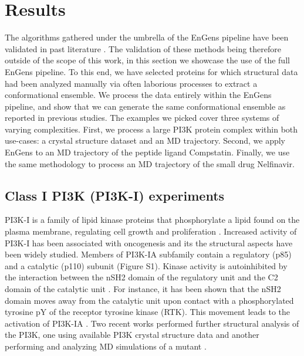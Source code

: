 \documentclass[numsec,webpdf,contemporary,large]{oup-authoring-template}
\theoremstyle{thmstyleone}%
\theoremstyle{thmstyletwo}%
\theoremstyle{thmstylethree}%
\begin{document}
\section{Results}

The algorithms gathered under the umbrella of the EnGens pipeline have been validated in past literature \citep{scherer_pyemma_2015, chen_nonlinear_2019, trozzi_umap_2021, perez-hernandez_identification_2013, schwantes_modeling_2015}. The validation of these methods being therefore outside of the scope of this work, in this section we showcase the use of the full EnGens pipeline. To this end, we have selected proteins for which structural data had been analyzed manually via often laborious processes to extract a conformational ensemble. We process the data entirely within the EnGens pipeline, and show that we can generate the same conformational ensemble as reported in previous studies. The examples we picked cover three systems of varying complexities. First, we process a large PI3K protein complex within both use-cases: a crystal structure dataset and an MD trajectory. Second, we apply EnGens to an MD trajectory of the peptide ligand Compstatin. Finally, we use the same methodology to process an MD trajectory of the small drug Nelfinavir.


\subsection{Class I PI3K (PI3K-I) experiments}

PI3K-I is a family of lipid kinase proteins that phosphorylate a lipid found on the plasma membrane, regulating cell growth and proliferation \citep{martini_pi3kakt_2014}. Increased activity of PI3K-I has been associated with oncogenesis and its the structural aspects have been widely studied. Members of PI3K-IA subfamily contain a regulatory (p85) and a catalytic (p110) subunit (Figure S1). Kinase activity is autoinhibited by the interaction between the nSH2 domain of the regulatory unit and the C2 domain of the catalytic unit \citep{yu_regulation_1998, miller_structural_2014}. For instance, it has been shown that the nSH2 domain moves away from the catalytic unit upon contact with a phosphorylated tyrosine pY of the receptor tyrosine kinase (RTK). This movement leads to the activation of PI3K-IA \citep{buckles_single-molecule_2017, nolte_crystal_1996, vadas_structural_2011}. Two recent works performed further structural analysis of the PI3K, one using available PI3K crystal structure data \citep{zhang_structural_2020}  and another performing and analyzing MD simulations of a mutant \citep{galdadas_unravelling_2020}. 
\end{document}
